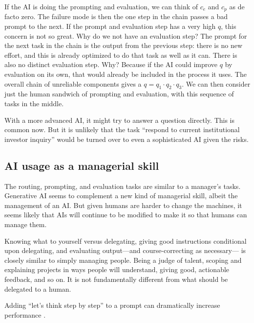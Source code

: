 \documentclass{article}
\begin{document}
If the AI is doing the prompting and evaluation, we can think of $c_e$ and $c_p$ as de facto zero.
The failure mode is then the one step in the chain passes a bad prompt to the next. 
If the prompt and evaluation step has a very high $q$, this concern is not so great. 
Why do we not have an evaluation step? 
The prompt for the next task in the chain is the output from the previous step: there is no new effort, and this is already optimized to do that task as well as it can. 
There is also no distinct evaluation step. Why? 
Because if the AI could improve $q$ by evaluation on its own, that would already be included in the process it uses. 
The overall chain of unreliable components gives a $q = q_1 \cdot q_2 \cdot q_3$.
We can then consider just the human sandwich of prompting and evaluation, with this sequence of tasks in the middle.  

With a more advanced AI, it might try to answer a question directly.
This is common now. 
But it is unlikely that the task ``respond to current institutional investor inquiry'' would be turned over to even a sophisticated AI given the risks.

\subsection{AI usage as a managerial skill}
The routing, prompting, and evaluation tasks are similar to a manager's tasks.
Generative AI seems to complement a new kind of managerial skill, albeit the management of an AI. 
But given humans are harder to change the machines, it seems likely that AIs will continue to be modified to make it so that humans can manage them. 

Knowing what to yourself versus delegating, giving good instructions conditional upon delegating, and evaluating output---and course-correcting as necessary--- is closely similar to simply managing people.
Being a judge of talent, scoping and explaining projects in ways people will understand, giving good, actionable feedback, and so on. 
It is not fundamentally different from what should be delegated to a human. 

Adding ``let's think step by step'' to a prompt can dramatically increase performance \citep{kojima2023large}.

\end{document}
